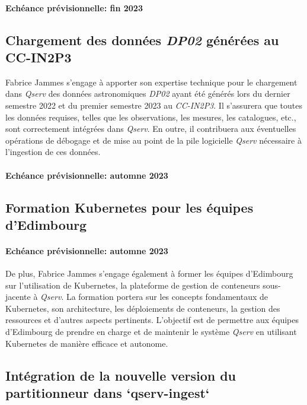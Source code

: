 \documentclass[french] {article}
\begin{document}
\paragraph{Echéance prévisionnelle: fin 2023}

\subsection{Chargement des données \textit{DP02} générées au CC-IN2P3}

Fabrice Jammes s'engage à apporter son expertise technique pour le chargement dans \textit{Qserv} des données astronomiques \textit{DP02} ayant été générés lors du dernier semestre 2022 et du premier semestre 2023 au \textit{CC-IN2P3}.
Il s'assurera que toutes les données requises, telles que les observations, les mesures, les catalogues, etc., sont correctement intégrées dans \textit{Qserv}. En outre, il contribuera aux éventuelles opérations de débogage et de mise au point de la pile logicielle \textit{Qserv} nécessaire à l'ingestion de ces données.

\paragraph{Echéance prévisionnelle: automne 2023}

\subsection{Formation Kubernetes pour les équipes d'Edimbourg}

\paragraph{Echéance prévisionnelle: automne 2023}

De plus, Fabrice Jammes  s'engage également à former les équipes d'Edimbourg sur l'utilisation de Kubernetes, la plateforme de gestion de conteneurs sous-jacente à \textit{Qserv}. La formation portera sur les
concepts fondamentaux de Kubernetes, son architecture, les déploiements de conteneurs, la gestion des ressources et d'autres aspects pertinents. L'objectif est de permettre aux équipes d'Edimbourg de prendre
en charge et de maintenir le système \textit{Qserv} en utilisant Kubernetes de manière efficace et autonome.

\subsection{Intégration de la nouvelle version du partitionneur dans `qserv-ingest`}
\end{document}
